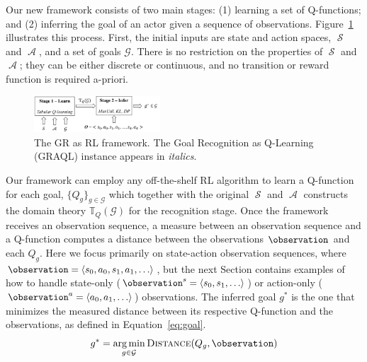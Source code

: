 \documentclass[letterpaper]{article} %
\DeclareMathOperator{\statespace}{\mathcal{S}}
\DeclareMathOperator{\actionspace}{\mathcal{A}}
\DeclareMathOperator*{\argmin}{arg\,min}
\providecommand\theory{\mathbb{T}}
\providecommand\goals{\mathcal{G}}
\begin{document}
Our new framework consists of two main stages: (1) learning a set of Q-functions; and (2) inferring the goal of an actor given a sequence of observations.
Figure~\ref{fig:RL4GR} illustrates this process.
First, the initial inputs are state and action spaces, $\statespace$ and $\actionspace$, and a set of goals $\goals$.
%
There is no restriction on the properties of $\statespace$ and $\actionspace$; they can be either discrete or continuous, and no transition or reward function is required a-priori. %
%
\begin{figure}[t]
    \centering
    \includegraphics[width=0.42\textwidth]{Figures/RL4GR.pdf}
    \caption{The GR as RL framework. The Goal Recognition as Q-Learning (GRAQL) instance appears in \textit{italics}.}
    \label{fig:RL4GR}
\end{figure}
%
Our framework can employ any off-the-shelf RL algorithm to learn a Q-function for each goal, $\{Q_g\}_{g \in \goals}$ which together with the original $\statespace$ and $\actionspace$ constructs the domain theory $\theory_{Q}(\goals)$ for the recognition stage.
Once the framework receives an observation sequence, a measure between an observation sequence and a Q-function computes a distance between the observations $\observation$ and each $Q_g$.
Here we focus primarily on state-action observation sequences, where $\observation = \langle s_0, a_0, s_1, a_1, \ldots \rangle$, but the next Section contains examples of how to handle state-only ($\observation^s = \langle s_0, s_1,\ldots \rangle$) or action-only ($\observation^a = \langle a_0, a_1,\ldots \rangle$) observations.
The inferred goal $g^*$ is the one that minimizes the measured distance between its respective Q-function and the observations, as defined in Equation~\ref{eq:goal}.
%
%
\begin{equation}
\label{eq:goal}
    g^* = \argmin_{g \in \goals} {\textsc{Distance}(Q_g, \observation)}
\end{equation}
\end{document}
